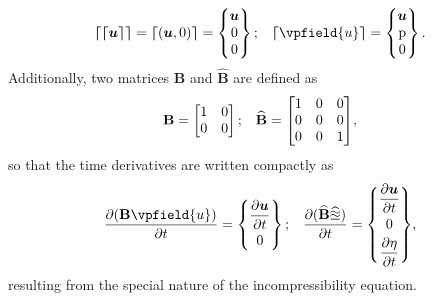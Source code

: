 \begin{equation}
	\begin{aligned}
		\blbracket \blbracket \vfield{u} \brbracket\brbracket =
		\blbracket (\vfield{u},\pfield{0}) \brbracket =
		\begin{Bmatrix}
			\vfield{u} \\
			\pfield{0} \\
			0
		\end{Bmatrix}; 
		&	&
		\blbracket \vpfield{u} \brbracket =
		\begin{Bmatrix}
			\vfield{u} \\
			\pfield{p} \\
			0
		\end{Bmatrix}.
	\end{aligned}
	\nonumber
\end{equation}
Additionally, two matrices $\mathbf{B}$ and $\mathbf{\widehat{B}}$ are defined as 
\begin{equation}
	\begin{aligned}
		\mathbf{B} =
		\begin{bmatrix}
			1 & \mathrm{0} \\ 
			0 & \mathrm{0}
		\end{bmatrix}; 
		&	&
		\mathbf{\widehat{B}} =
		\begin{bmatrix}
			1 & 0 & 0 \\ 
			0 & 0 & 0 \\
			0 & 0 & 1
		\end{bmatrix}
	\end{aligned}
	\nonumber,
\end{equation}
so that the time derivatives are written compactly as 
\begin{equation}
	\begin{aligned}
		\dfrac{\partial (\mathbf{B}\vpfield{u})}{\partial t} =
		\begin{Bmatrix}
			\dfrac{\partial \vfield{u}}{\partial t} \vspace{1mm}\\
			\pfield{0}
		\end{Bmatrix}; 
		&	&
		\dfrac{\partial (\mathbf{\widehat{B}}\efield{u})}{\partial t} =
		\begin{Bmatrix}
			\dfrac{\partial \vfield{u}}{\partial t} \vspace{1mm}\\
			\pfield{0} \vspace{1mm}\\
			\dfrac{\partial \eta}{\partial t}
		\end{Bmatrix}
	\end{aligned},
	\nonumber
\end{equation}
resulting from the special nature of the incompressibility equation.

